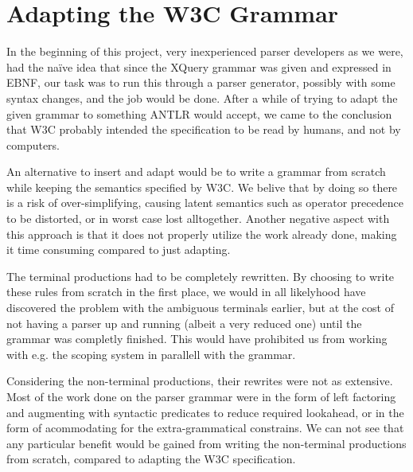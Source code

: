 \section{Adapting the W3C Grammar}
\label{sect:discussion:adaptW3C}

In the beginning of this project, very inexperienced parser developers as we
were, had the na\"{i}ve idea that since the XQuery grammar was given and
expressed in EBNF, our task was to run this through a parser generator,
possibly with some syntax changes, and the job would be done. After a while of
trying to adapt the given grammar to something ANTLR would accept, we came to
the conclusion that W3C probably intended the specification to be read by
humans, and not by computers. 

An alternative to insert and adapt would be to write a grammar from scratch
while keeping the semantics specified by W3C. We belive that by doing so there
is a risk of over-simplifying, causing latent semantics such as operator
precedence to be distorted, or in worst case lost alltogether. Another negative
aspect with this approach is that it does not properly utilize the work already
done, making it time consuming compared to just adapting.

The terminal productions had to be completely rewritten. By choosing to write
these rules from scratch in the first place, we would in all likelyhood have
discovered the problem with the ambiguous terminals earlier, but at the cost of
not having a parser up and running (albeit a very reduced one) until the
grammar was completly finished. This would have prohibited us from working with
e.g. the scoping system in parallell with the grammar.

Considering the non-terminal productions, their rewrites were not as extensive.
Most of the work done on the parser grammar were in the form of left factoring
and augmenting with syntactic predicates to reduce required lookahead, or in the form of
acommodating for the extra-grammatical constrains. We can not see that any
particular benefit would be gained from writing the non-terminal productions
from scratch, compared to adapting the W3C specification.
